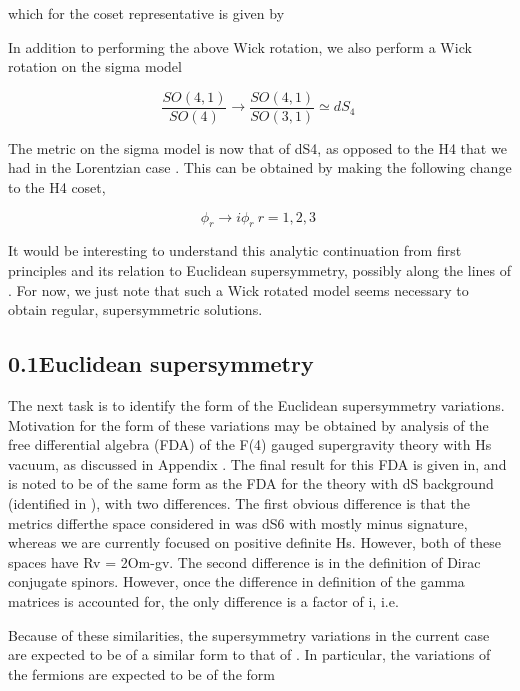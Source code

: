 \documentclass{article}
\begin{document}
\sloppy

which for the coset representative is given by


In addition to performing the above Wick rotation, we also perform a Wick rotation on the
sigma model


\begin{equation}
\frac { S O ( 4, 1 ) } { S O ( 4 ) } \rightarrow \frac { S O ( 4, 1 ) } { S O ( 3, 1 ) } \simeq d S _ { 4 } ~
\end{equation}


The metric on the sigma model is now that of dS4, as opposed to the H4 that we had in the
Lorentzian case . This can be obtained by making the following change to the H4 coset,


\begin{equation}
\phi _ { r } \rightarrow i \phi _ { r } ~ r = 1, 2, 3 ~
\end{equation}


It would be interesting to understand this analytic continuation from first principles and its
relation to Euclidean supersymmetry, possibly along the lines of . For now, we just note that
such a Wick rotated model seems necessary to obtain regular, supersymmetric solutions.


\subsection*{0.1Euclidean supersymmetry}


The next task is to identify the form of the Euclidean supersymmetry variations. Motivation
for the form of these variations may be obtained by analysis of the free differential algebra
(FDA) of the F(4) gauged supergravity theory with Hs vacuum, as discussed in Appendix .
The final result for this FDA is given in, and is noted to be of the same form as the FDA
for the theory with dS background (identified in ), with two differences. The first obvious
difference is that the metrics differthe space considered in was dS6 with mostly minus
signature, whereas we are currently focused on positive definite Hs. However, both of these
spaces have Rv = 2Om-gv. The second difference is in the definition of Dirac conjugate
spinors. However, once the difference in definition of the gamma matrices is accounted for,
the only difference is a factor of i, i.e.


Because of these similarities, the supersymmetry variations in the current case are expected
to be of a similar form to that of . In particular, the variations of the fermions are expected
to be of the form
\end{document}
